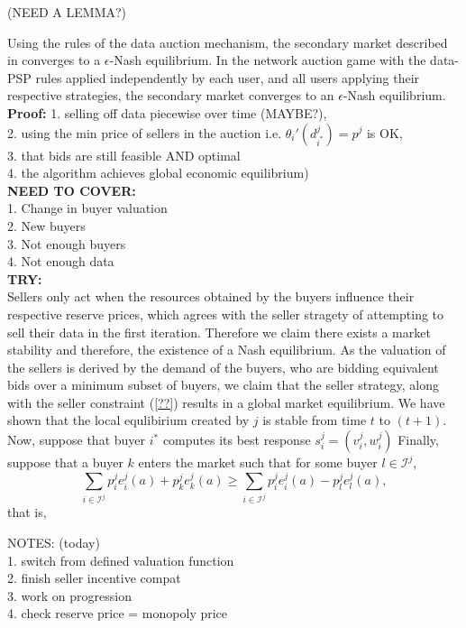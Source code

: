 \documentclass[12pt]{article}
\theoremstyle{definition}
\newcommand{\mcI}{\mathcal{I}}
\begin{document}
\begin{multicols}{2}
{
 (NEED A LEMMA?)
}

{
Using the rules of the data auction mechanism, the secondary market described in
\cite{zheng} converges to a $\epsilon$-Nash equilibrium. In the network auction
game with the data-PSP rules applied independently by each user, and all users applying
their respective strategies, the secondary market converges to an $\epsilon$-Nash
equilibrium. 
}\\
\textbf{Proof:}
1. selling off data piecewise over time (MAYBE?), \\
2. using the min price of sellers in the auction i.e. ${\theta_i}'(d_{i^*}^j) =
p^j$ is OK, \\
3. that bids are still feasible AND optimal \\
4. the algorithm achieves global economic equilibrium)\\
\textbf{NEED TO COVER:}\\
1. Change in buyer valuation \\
2. New buyers\\
3. Not enough buyers \\
4. Not enough data\\
\textbf{TRY:}\\
Sellers only act when the resources obtained by the buyers influence their
respective reserve prices, which agrees with the seller stragety of attempting
to sell their data in the first iteration. Therefore we claim there exists a
market stability and therefore, the existence of a Nash equilibrium. As the
valuation of the sellers is derived by the demand of the buyers, who are
bidding equivalent bids over a minimum subset of buyers, we claim that the seller
strategy, along with the seller constraint (\ref{??}) results in a global
market equilibrium.
We have shown that the local
equlibirium created by $j$ is stable from time $t$ to $(t+1)$. 
Now, suppose that buyer $i^*$ computes its best response $s_i^j = (v_i^j, w_i^j)$
Finally, suppose that
a buyer $k$ enters the market such that for some buyer $l\in\mcI^j$,
$$
    \displaystyle\sum_{i\in\mcI^j} p_i^je_i^j(a) + p_k^je_k^j(a) \ge
\sum_{i\in\mcI^j} p_i^je_i^j(a) - p_l^je_l^j(a),
$$
that is,



NOTES: (today)\\
1. switch from defined valuation function\\
2. finish seller incentive compat\\
3. work on progression\\
4. check reserve price = monopoly price



\end{multicols}
\end{document}

